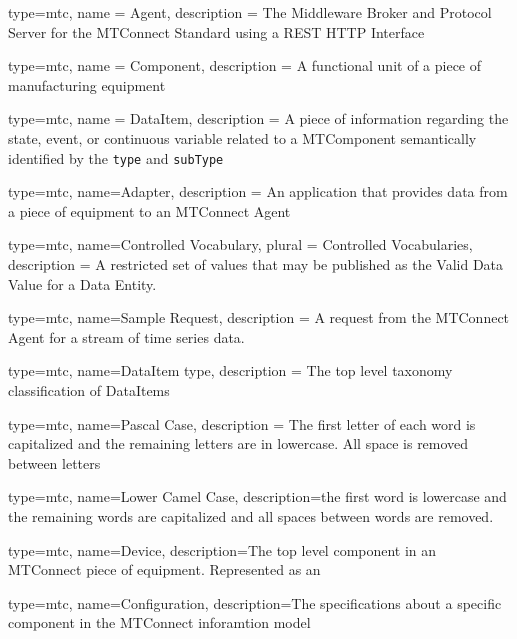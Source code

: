 




{
  type=mtc,
  name = {Agent},
  description = {The Middleware Broker and Protocol Server for the MTConnect Standard using a REST HTTP Interface}
}

{
  type=mtc,
  name = Component,
  description = {A functional unit of a piece of manufacturing equipment}
}

{
  type=mtc,
  name = DataItem,
  description = {A piece of information regarding the state, event, or continuous variable related to a \gls{MTComponent} semantically identified by the \texttt{type} and \texttt{subType}}
}

{
  type=mtc,
  name=Adapter,
  description = {An application that provides data from a piece of equipment to an MTConnect Agent}
}

{
  type=mtc,
  name={Controlled Vocabulary},
  plural = {Controlled Vocabularies},
  description = {A restricted set of values that may be published as the Valid Data Value for a Data Entity.}
}

{
  type=mtc,
  name={Sample Request},
  description = {A request from the MTConnect \gls{Agent} for a stream of time series data.}
}

{
  type=mtc,
  name={DataItem type},
  description = {The top level taxonomy classification of \glspl{DataItem}}
}

{
  type=mtc,
  name={Pascal Case},
  description = {The first letter of each word is capitalized and the remaining letters are in lowercase. All space is removed between letters}
}

{
  type=mtc,
  name={Lower Camel Case},
  description={the first word is lowercase and the remaining words are capitalized and all spaces between words are removed.}
}


{
  type=mtc,
  name=Device,
  description={The top level component in an MTConnect piece of equipment. Represented as an }
}

{
  type=mtc,
  name=Configuration,
  description={The specifications about a specific component in the MTConnect inforamtion model}
}

